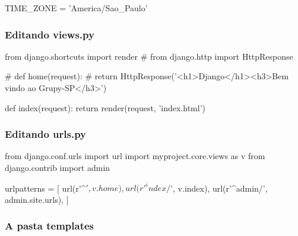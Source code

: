 \documentclass[aspectratio=169]{beamer}
\begin{document}
{\begin{frame}[fragile]
\begin{pythoncode}
TIME_ZONE = 'America/Sao_Paulo'
\end{pythoncode}


\end{frame}



\begin{frame}[fragile]\frametitle{Editando views.py}

\begin{pythoncode}
from django.shortcuts import render
# from django.http import HttpResponse

# def home(request):
#     return HttpResponse('<h1>Django</h1><h3>Bem vindo ao Grupy-SP</h3>')

def index(request):
    return render(request, 'index.html')
\end{pythoncode}


\end{frame}

\begin{frame}[fragile]\frametitle{Editando urls.py}

\begin{pythoncode}
from django.conf.urls import url
import myproject.core.views as v
from django.contrib import admin

urlpatterns = [
    url(r'^$', v.home),
    url(r'^index/$', v.index),
    url(r'^admin/', admin.site.urls),
]
\end{pythoncode}


\end{frame}


\begin{frame}\frametitle{A pasta templates}


\end{frame}

\begin{frame}


\end{frame}}
\end{document}
